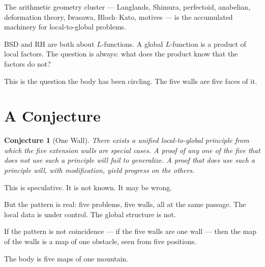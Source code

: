 \documentclass[12pt]{article}
\newtheorem{conjecture}{Conjecture}
\begin{document}
The arithmetic geometry cluster ---
Langlands, Shimura, perfectoid, anabelian,
deformation theory, Iwasawa, Bloch--Kato, motives ---
is the accumulated machinery for local-to-global problems.

BSD and RH are both about $L$-functions.
A global $L$-function is a product of local factors.
The question is always: what does the product know
that the factors do not?

This is the question the body has been circling.
The five walls are five faces of it.

\section{A Conjecture}

\begin{conjecture}[One Wall]
There exists a unified local-to-global principle
from which the five extension walls
are special cases.
A proof of any one of the five
that does not use such a principle
will fail to generalize.
A proof that does use such a principle
will, with modification,
yield progress on the others.
\end{conjecture}

This is speculative.
It is not known.
It may be wrong.

But the pattern is real:
five problems, five walls,
all at the same passage.
The local data is under control.
The global structure is not.

If the pattern is not coincidence ---
if the five walls are one wall ---
then the map of the walls
is a map of one obstacle,
seen from five positions.

The body is five maps of one mountain.
\end{document}
